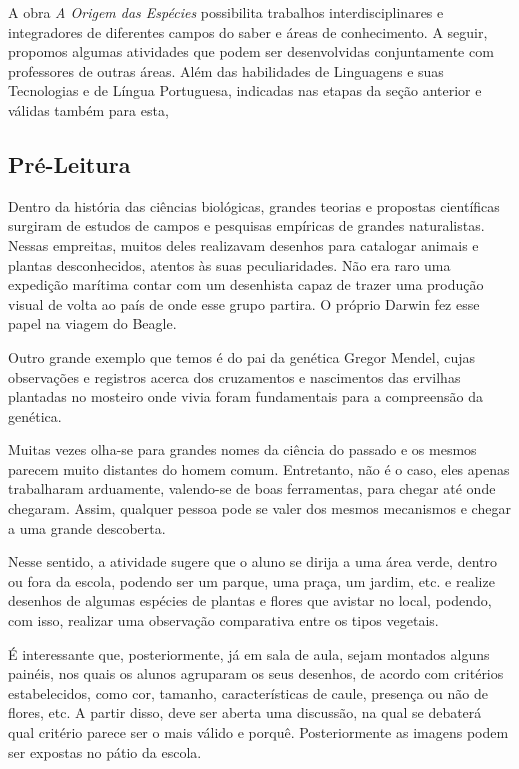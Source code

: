 \documentclass[12pt]{extarticle}
\begin{document}
A obra \emph{A Origem das Espécies} possibilita trabalhos
interdisciplinares e integradores de diferentes campos do saber e áreas
de conhecimento. A seguir, propomos algumas atividades que podem ser
desenvolvidas conjuntamente com professores de outras áreas. Além das
habilidades de Linguagens e suas Tecnologias e de Língua Portuguesa,
indicadas nas etapas da seção anterior e válidas também para esta,

\subsection{Pré-Leitura}

Dentro da história das ciências biológicas, grandes teorias
e propostas científicas surgiram de estudos de campos e pesquisas
empíricas de grandes naturalistas. Nessas empreitas, muitos deles
realizavam desenhos para catalogar animais e plantas desconhecidos,
atentos às suas peculiaridades. Não era raro uma expedição marítima
contar com um desenhista capaz de trazer uma produção visual de volta ao
país de onde esse grupo partira. O próprio Darwin fez esse papel na
viagem do Beagle.

Outro grande exemplo que temos é do pai da genética Gregor Mendel, cujas
observações e registros acerca dos cruzamentos e nascimentos das
ervilhas plantadas no mosteiro onde vivia foram fundamentais para a
compreensão da genética.

Muitas vezes olha-se para grandes nomes da ciência do passado e os
mesmos parecem muito distantes do homem comum. Entretanto, não é o caso,
eles apenas trabalharam arduamente, valendo-se de boas ferramentas, para
chegar até onde chegaram. Assim, qualquer pessoa pode se valer dos
mesmos mecanismos e chegar a uma grande descoberta.

Nesse sentido, a atividade sugere que o aluno se dirija a uma área
verde, dentro ou fora da escola, podendo ser um parque, uma praça, um
jardim, etc. e realize desenhos de algumas espécies de plantas e flores
que avistar no local, podendo, com isso, realizar uma observação
comparativa entre os tipos vegetais.

É interessante que, posteriormente, já em sala de aula, sejam montados
alguns painéis, nos quais os alunos agruparam os seus desenhos, de
acordo com critérios estabelecidos, como cor, tamanho, características
de caule, presença ou não de flores, etc. A partir disso, deve ser
aberta uma discussão, na qual se debaterá qual critério parece ser o
mais válido e porquê. Posteriormente as imagens podem ser expostas no
pátio da escola.
\end{document}
